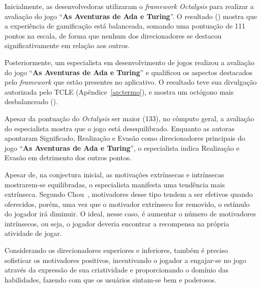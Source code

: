 Inicialmente, as desenvolvedoras utilizaram o \textit{framework Octalysis} para realizar a avaliação do jogo “\textbf{As Aventuras de Ada e Turing}”. O resultado () mostra que a experiência de gamificação está balanceada, somando uma pontuação de 111 pontos na escala, de forma que nenhum dos direcionadores se destacou significativamente em relação aos outros.


Posteriormente, um especialista em desenvolvimento de jogos realizou a avaliação do jogo “\textbf{As Aventuras de Ada e Turing}” e qualificou os aspectos destacados pelo \textit{framework} que estão presentes no aplicativo. O resultado teve sua divulgação autorizada pelo \acrfull{TCLE} (Apêndice~\ref{ap:termo}), e mostra um octógono mais desbalanceado ().

Apesar da pontuação do \textit{Octalysis} ser maior (133), no cômputo geral, a avaliação do especialista mostra que o jogo está desequilibrado. Enquanto as autoras apontaram Significado, Realização e Evasão como direcionadores principais do jogo “\textbf{As Aventuras de Ada e Turing}”, o especialista indica Realização e Evasão em detrimento dos outros pontos.

Apesar de, na conjectura inicial, as motivações extrínsecas e intrínsecas mostrarem-se equilibradas, o especialista manifesta uma tendência mais extrínseca. Segundo Chou~\cite{chou_octalysis_2015}, motivadores desse tipo tendem a ser efetivos quando oferecidos, porém, uma vez que o motivador extrínseco for removido, o estímulo do jogador irá diminuir. O ideal, nesse caso, é aumentar o número de motivadores intrínsecos, ou seja, o jogador deveria encontrar a recompensa na própria atividade de jogar.

Considerando os direcionadores superiores e inferiores, também é preciso sofisticar os motivadores positivos, incentivando o jogador a engajar-se no jogo através da expressão de sua criatividade e proporcionando o domínio das habilidades, fazendo com que os usuários sintam-se bem e poderosos.

